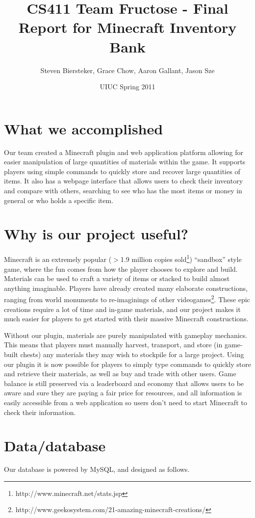 \documentclass[12pt]{article}
\title{CS411 Team Fructose - Final Report for Minecraft Inventory Bank}
\author{Steven Biersteker, Grace Chow, Aaron Gallant, Jason Sze}
\date{UIUC Spring 2011}
\begin{document}
\maketitle

\section{What we accomplished}
Our team created a Minecraft plugin and web application platform allowing for easier manipulation of large quantities of materials within the game. It supports players using simple commands to quickly store and recover large quantities of items. It also has a webpage interface that allows users to check their inventory and compare with others, searching to see who has the most items or money in general or who holds a specific item.

\section{Why is our project useful?}
Minecraft is an extremely popular ($>$1.9 million copies sold\footnote{http://www.minecraft.net/stats.jsp}) ``sandbox'' style game, where the fun comes from how the player chooses to explore and build. Materials can be used to craft a variety of items or stacked to build almost anything imaginable. Players have already created many elaborate constructions, ranging from world monuments to re-imaginings of other videogames\footnote{http://www.geekosystem.com/21-amazing-minecraft-creations/}. These epic creations require a lot of time and in-game materials, and our project makes it much easier for players to get started with their massive Minecraft constructions.

Without our plugin, materials are purely manipulated with gameplay mechanics. This means that players must manually harvest, transport, and store (in game-built chests) any materials they may wish to stockpile for a large project. Using our plugin it is now possible for players to simply type commands to quickly store and retrieve their materials, as well as buy and trade with other users. Game balance is still preserved via a leaderboard and economy that allows users to be aware and sure they are paying a fair price for resources, and all information is easily accessible from a web application so users don't need to start Minecraft to check their information.

\section{Data/database}
Our database is powered by MySQL, and designed as follows.
\end{document}
